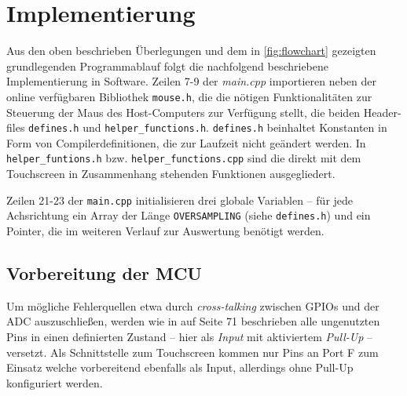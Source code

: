 \chapter{Implementierung}
	Aus den oben beschrieben Überlegungen und dem in \cref{fig:flowchart} gezeigten grundlegenden Programmablauf folgt die nachfolgend beschriebene Implementierung in Software.
	Zeilen 7-9 der \textit{main.cpp} importieren neben der online verfügbaren Bibliothek \texttt{mouse.h}, die die nötigen Funktionalitäten zur Steuerung der Maus des Host-Computers zur Verfügung stellt, die beiden Header-files \texttt{defines.h} und \texttt{helper\_functions.h}.
	\texttt{defines.h} beinhaltet Konstanten in Form von Compilerdefinitionen, die zur Laufzeit nicht geändert werden.
	In \texttt{helper\text\_funtions.h} bzw. \texttt{helper\text\_functions.cpp} sind die direkt mit dem Touchscreen in Zusammenhang stehenden Funktionen ausgegliedert.\par\medskip

	Zeilen 21-23 der \texttt{main.cpp} initialisieren drei globale Variablen -- für jede Achsrichtung ein Array der Länge \texttt{OVERSAMPLING} (siehe \texttt{defines.h}) und ein Pointer, die im weiteren Verlauf zur Auswertung benötigt werden.

	\section{Vorbereitung der MCU}
		Um mögliche Fehlerquellen etwa durch \textit{cross-talking} zwischen GPIOs und der ADC auszuschließen, werden wie in \cite{MicrochipTechnologyInc.ATmega32U4.Datasheet.2016} auf Seite 71 beschrieben alle ungenutzten Pins in einen definierten Zustand -- hier als \textit{Input} mit aktiviertem \textit{Pull-Up} -- versetzt.
		Als Schnittstelle zum Touchscreen kommen nur Pins an Port F zum Einsatz welche vorbereitend ebenfalls als Input, allerdings ohne Pull-Up konfiguriert werden.\par\medskip

